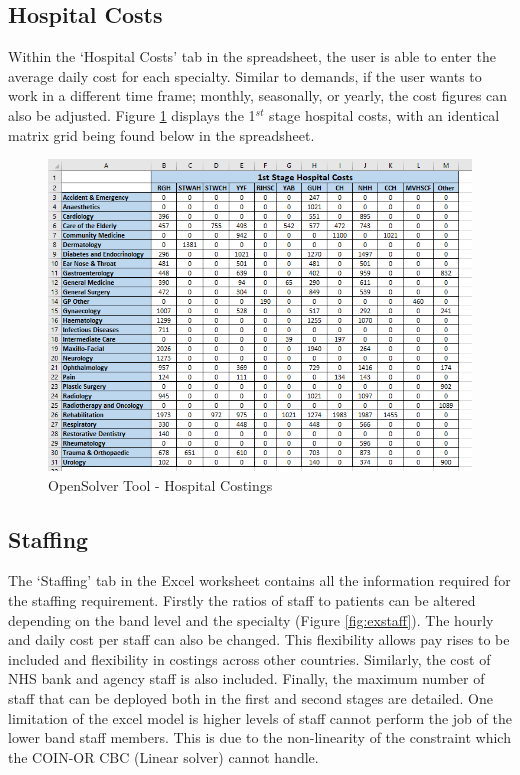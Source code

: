 \documentclass[../thesis.tex]{subfiles}
\begin{document}
\subsection*{Hospital Costs}
Within the `Hospital Costs' tab in the spreadsheet, the user is able to enter the average daily cost for each specialty. Similar to demands, if the user wants to work in a different time frame; monthly, seasonally, or yearly, the cost figures can also be adjusted. Figure \ref{fig:excostings} displays the 1$^{st}$ stage hospital costs, with an identical matrix grid being found below in the spreadsheet. 
\begin{figure}[h!]
    \centering
    \includegraphics{Chapters/Chapter7/Figures/Costings.png}
    \caption{OpenSolver Tool - Hospital Costings}
    \label{fig:excostings}
\end{figure}

\subsection*{Staffing}
The `Staffing' tab in the Excel worksheet contains all the information required for the staffing requirement. Firstly the ratios of staff to patients can be altered depending on the band level and the specialty (Figure \ref{fig:exstaff}). The hourly and daily cost per staff can also be changed. This flexibility allows pay rises to be included and flexibility in costings across other countries. Similarly, the cost of NHS bank and agency staff is also included. Finally, the maximum number of staff that can be deployed both in the first and second stages are detailed. One limitation of the excel model is higher levels of staff cannot perform the job of the lower band staff members. This is due to the non-linearity of the constraint which the COIN-OR CBC (Linear solver) cannot handle.
\end{document}
